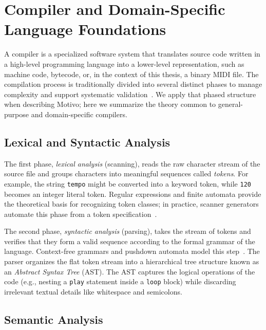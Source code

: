 \section{Compiler and Domain-Specific Language Foundations}\label{sec:compiler-dsl-foundations}

A compiler is a specialized software system that translates source code written in a high-level programming language
into a lower-level representation, such as machine code, bytecode, or, in the context of this thesis, a binary MIDI
file.
The compilation process is traditionally divided into several distinct phases to manage complexity and support
systematic validation~\cite{Aho_Lam_Sethi_Ullman_2006,Cooper_Torczon_2011}.
We apply that phased structure when describing Motivo; here we summarize the theory common to
general-purpose and domain-specific compilers.

\subsection{Lexical and Syntactic Analysis}\label{detail-subsec:lexical-and-syntactic-analysis}

The first phase, \textit{lexical analysis} (scanning), reads the raw character stream of the source file and groups
characters into meaningful sequences called \textit{tokens}.
For example, the string \texttt{tempo} might be converted into a keyword token, while \texttt{120} becomes an integer
literal token.
Regular expressions and finite automata provide the theoretical basis for recognizing token classes; in practice,
scanner generators automate this phase from a token specification~\cite{Aho_Lam_Sethi_Ullman_2006}.

The second phase, \textit{syntactic analysis} (parsing), takes the stream of tokens and verifies that they form a
valid sequence according to the formal grammar of the language.
Context-free grammars and pushdown automata model this step~\cite{Aho_Lam_Sethi_Ullman_2006}.
The parser organizes the flat token stream into a hierarchical tree structure known as an \textit{Abstract Syntax Tree}
(AST).
The AST captures the logical operations of the code (e.g., nesting a \texttt{play} statement inside a \texttt{loop}
block) while discarding irrelevant textual details like whitespace and semicolons.

\subsection{Semantic Analysis}\label{detail-subsec:semantic-analysis}

